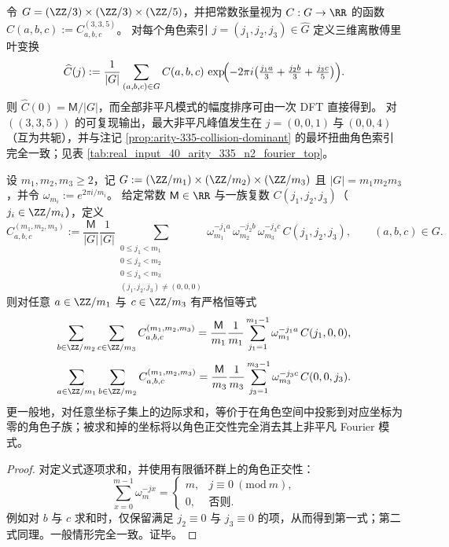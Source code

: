 \begin{remark}\label{rem:arity-335-constant-tensor-3d-dft-worst}
令 \(G=(\ZZ/3)\times(\ZZ/3)\times(\ZZ/5)\)，并把常数张量视为 \(C:G\to\RR\) 的函数 \(C(a,b,c):=C^{(3,3,5)}_{a,b,c}\)。
对每个角色索引 \(j=(j_1,j_2,j_3)\in\widehat G\) 定义三维离散傅里叶变换
\[
\widehat C(j)
:=\frac{1}{|G|}\sum_{(a,b,c)\in G} C(a,b,c)\,
\exp\!\Bigl(-2\pi i\bigl(\tfrac{j_1a}{3}+\tfrac{j_2b}{3}+\tfrac{j_3c}{5}\bigr)\Bigr).
\]
则 \(\widehat C(0)=\mathsf{M}/|G|\)，而全部非平凡模式的幅度排序可由一次 DFT 直接得到。
对 \(((3,3,5))\) 的可复现输出，最大非平凡峰值发生在
\(
j=(0,0,1)\ \text{与}\ (0,0,4)
\)
（互为共轭），并与注记 \ref{prop:arity-335-collision-dominant} 的最坏扭曲角色索引完全一致；见表 \ref{tab:real_input_40_arity_335_n2_fourier_top}。
\end{remark}


\begin{lemma}[边际求和即角色投影]\label{lem:arity-character-projection}
设 \(m_1,m_2,m_3\ge 2\)，记
\(
G:=(\ZZ/m_1)\times(\ZZ/m_2)\times(\ZZ/m_3)
\)
且 \(|G|=m_1m_2m_3\)，并令 \(\omega_{m_i}:=e^{2\pi i/m_i}\)。
给定常数 \(\mathsf{M}\in\RR\) 与一族复数 \(C(j_1,j_2,j_3)\)（\(j_i\in\ZZ/m_i\)），定义
\[
C^{(m_1,m_2,m_3)}_{a,b,c}
:=
\frac{\mathsf{M}}{|G|}
\frac{1}{|G|}
\!\!\!\sum_{\substack{0\le j_1<m_1\\0\le j_2<m_2\\0\le j_3<m_3\\(j_1,j_2,j_3)\ne(0,0,0)}}
\omega_{m_1}^{-j_1a}\,\omega_{m_2}^{-j_2b}\,\omega_{m_3}^{-j_3c}\,C(j_1,j_2,j_3),
\qquad (a,b,c)\in G.
\]
则对任意 \(a\in\ZZ/m_1\) 与 \(c\in\ZZ/m_3\) 有严格恒等式
\[
\sum_{b\in\ZZ/m_2}\sum_{c\in\ZZ/m_3} C^{(m_1,m_2,m_3)}_{a,b,c}
=
\frac{\mathsf{M}}{m_1}
\frac{1}{m_1}\sum_{j_1=1}^{m_1-1}\omega_{m_1}^{-j_1a}\,C(j_1,0,0),
\]
\[
\sum_{a\in\ZZ/m_1}\sum_{b\in\ZZ/m_2} C^{(m_1,m_2,m_3)}_{a,b,c}
=
\frac{\mathsf{M}}{m_3}
\frac{1}{m_3}\sum_{j_3=1}^{m_3-1}\omega_{m_3}^{-j_3c}\,C(0,0,j_3).
\]
更一般地，对任意坐标子集上的边际求和，等价于在角色空间中投影到对应坐标为零的角色子族；被求和掉的坐标将以角色正交性完全消去其上非平凡 Fourier 模式。
\end{lemma}

\begin{proof}
对定义式逐项求和，并使用有限循环群上的角色正交性：
\[
\sum_{x=0}^{m-1}\omega_m^{-jx}
=
\begin{cases}
m,& j\equiv 0\ (\mathrm{mod}\ m),\\
0,& \text{否则}.
\end{cases}
\]
例如对 \(b\) 与 \(c\) 求和时，仅保留满足 \(j_2\equiv 0\) 与 \(j_3\equiv 0\) 的项，从而得到第一式；第二式同理。一般情形完全一致。证毕。
\end{proof}

